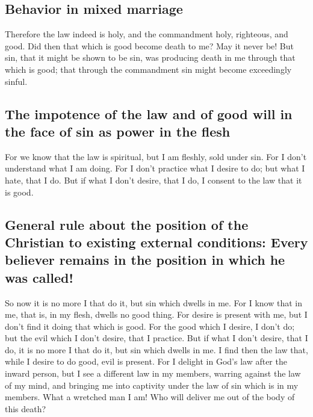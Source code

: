 \hypertarget{behavior-in-mixed-marriage}{%
\subsection{Behavior in mixed
marriage}\label{behavior-in-mixed-marriage}}

 Therefore the law indeed is holy, and the commandment
holy, righteous, and good.  Did then that which is good
become death to me? May it never be! But sin, that it might be shown to
be sin, was producing death in me through that which is good; that
through the commandment sin might become exceedingly sinful.

\hypertarget{the-impotence-of-the-law-and-of-good-will-in-the-face-of-sin-as-power-in-the-flesh}{%
\subsection{The impotence of the law and of good will in the face of sin
as power in the
flesh}\label{the-impotence-of-the-law-and-of-good-will-in-the-face-of-sin-as-power-in-the-flesh}}

 For we know that the law is spiritual, but I am fleshly,
sold under sin.  For I don't understand what I am doing.
For I don't practice what I desire to do; but what I hate, that I do.
 But if what I don't desire, that I do, I consent to the
law that it is good.

\hypertarget{general-rule-about-the-position-of-the-christian-to-existing-external-conditions-every-believer-remains-in-the-position-in-which-he-was-called}{%
\subsection{General rule about the position of the Christian to existing
external conditions: Every believer remains in the position in which he
was
called!}\label{general-rule-about-the-position-of-the-christian-to-existing-external-conditions-every-believer-remains-in-the-position-in-which-he-was-called}}

 So now it is no more I that do it, but sin which dwells
in me.  For I know that in me, that is, in my flesh,
dwells no good thing. For desire is present with me, but I don't find it
doing that which is good.  For the good which I desire, I
don't do; but the evil which I don't desire, that I practice.
 But if what I don't desire, that I do, it is no more I
that do it, but sin which dwells in me.  I find then the
law that, while I desire to do good, evil is present. 
For I delight in God's law after the inward person,  but
I see a different law in my members, warring against the law of my mind,
and bringing me into captivity under the law of sin which is in my
members.  What a wretched man I am! Who will deliver me
out of the body of this death?

